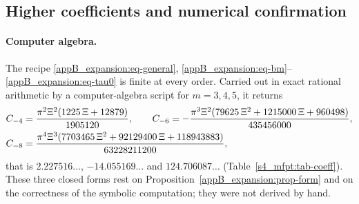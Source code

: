 \subsection{Higher coefficients and numerical confirmation}

\paragraph{Computer algebra.}
The recipe \eqref{appB_expansion:eq-general}, \eqref{appB_expansion:eq-bm}--\eqref{appB_expansion:eq-tau0} is finite
at every order. Carried out in exact rational arithmetic by a computer-algebra script for $m=3,4,5$, it returns
\begin{equation}\label{appB_expansion:eq-higher}
\begin{aligned}
  C_{-4}&=\frac{\pi^{2}\Xi^{2}(1225\,\Xi+12879)}{1905120},\qquad
  C_{-6}=-\frac{\pi^{3}\Xi^{2}(79625\,\Xi^{2}+1215000\,\Xi+960498)}{435456000},\\
  C_{-8}&=\frac{\pi^{4}\Xi^{3}(7703465\,\Xi^{2}+92129400\,\Xi+118943883)}{63228211200},
\end{aligned}
\end{equation}
that is $2.227516\ldots$, $-14.055169\ldots$ and $124.706087\ldots$ (Table~\ref{s4_mfpt:tab-coeff}). These three
closed forms rest on Proposition~\ref{appB_expansion:prop-form} and on the correctness of the symbolic computation;
they were not derived by hand.

